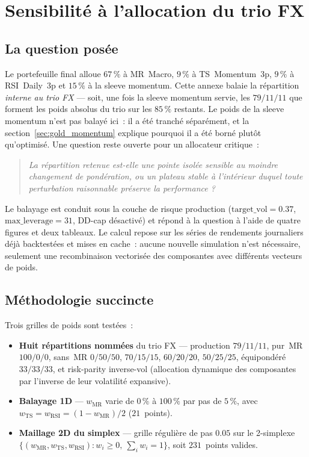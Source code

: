 \section{Sensibilité à l'allocation du trio FX}
\label{app:weight_sensitivity}

\subsection{La question posée}

Le portefeuille final alloue $67\,\%$ à MR~Macro, $9\,\%$ à TS~Momentum~3p, $9\,\%$ à RSI~Daily~3p et $15\,\%$ à la sleeve momentum. Cette annexe balaie la répartition \emph{interne au trio FX} --- soit, une fois la sleeve momentum servie, les $79/11/11$ que forment les poids absolus du trio sur les $85\,\%$ restants. Le poids de la sleeve momentum n'est pas balayé ici~: il a été tranché séparément, et la section~\ref{sec:gold_momentum} explique pourquoi il a été borné plutôt qu'optimisé. Une question reste ouverte pour un allocateur critique~:

\begin{quote}
\emph{La répartition retenue est-elle une pointe isolée sensible au moindre changement de pondération, ou un plateau stable à l'intérieur duquel toute perturbation raisonnable préserve la performance ?}
\end{quote}

Le balayage est conduit sous la couche de risque production ($\mathrm{target\_vol}=0.37$, $\mathrm{max\_leverage}=31$, DD-cap désactivé) et répond à la question à l'aide de quatre figures et deux tableaux. Le calcul repose sur les séries de rendements journaliers déjà backtestées et mises en cache~: aucune nouvelle simulation n'est nécessaire, seulement une recombinaison vectorisée des composantes avec différents vecteurs de poids.

\subsection{Méthodologie succincte}

Trois grilles de poids sont testées~:

\begin{itemize}
\item \textbf{Huit répartitions nommées} du trio FX --- production $79/11/11$, pur~MR $100/0/0$, sans~MR $0/50/50$, $70/15/15$, $60/20/20$, $50/25/25$, équipondéré $33/33/33$, et risk-parity inverse-vol (allocation dynamique des composantes par l'inverse de leur volatilité expansive).
\item \textbf{Balayage 1D} --- $w_{\text{MR}}$ varie de $0\,\%$ à $100\,\%$ par pas de $5\,\%$, avec $w_{\text{TS}} = w_{\text{RSI}} = (1-w_{\text{MR}})/2$ ($21$~points).
\item \textbf{Maillage 2D du simplex} --- grille régulière de pas $0.05$ sur le 2-simplexe $\{(w_{\text{MR}}, w_{\text{TS}}, w_{\text{RSI}}) : w_i \ge 0,\ \sum_i w_i = 1\}$, soit $231$~points valides.
\end{itemize}

